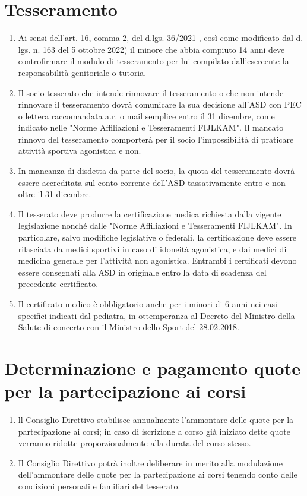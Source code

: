 \documentclass{djtsdoc}
\begin{document}
	\section{Tesseramento}
	\begin{enumerate}
		\item Ai sensi dell'art. 16, comma 2, del d.lgs. 36/2021 , così come modificato dal d. lgs. n. 163 del 5 ottobre 2022) il minore che abbia compiuto 14 anni deve controfirmare il modulo di tesseramento per lui compilato dall'esercente la responsabilità genitoriale o tutoria. 
		\item Il socio tesserato che intende rinnovare il tesseramento o che non intende rinnovare il tesseramento dovrà comunicare la sua decisione all'ASD con PEC o lettera raccomandata a.r. o mail semplice entro il 31 dicembre, come indicato nelle "Norme Affiliazioni e Tesseramenti FIJLKAM". Il mancato rinnovo del tesseramento comporterà per il socio l'impossibilità di praticare attività sportiva agonistica e non. 
		\item In mancanza di disdetta da parte del socio, la quota del tesseramento dovrà essere accreditata sul conto corrente dell'ASD  tassativamente entro e non oltre il 31 dicembre.
		\item Il tesserato deve produrre la certificazione medica richiesta dalla vigente legislazione nonché dalle "Norme Affiliazioni e Tesseramenti FIJLKAM". In particolare, salvo modifiche legislative o federali, la certificazione deve essere rilasciata da medici sportivi in caso di idoneità agonistica, e dai medici di medicina generale per l'attività non agonistica. Entrambi i certificati devono essere consegnati alla ASD in originale entro la data di scadenza del precedente certificato.
		\item Il certificato medico è obbligatorio anche per i minori di 6 anni nei casi specifici indicati dal pediatra, in ottemperanza al Decreto del Ministro della Salute di concerto con il Ministro dello Sport del 28.02.2018.
	\end{enumerate}
	
	\section{Determinazione e pagamento quote per la partecipazione ai corsi}
	\begin{enumerate}
		\item ll Consiglio Direttivo stabilisce annualmente l'ammontare delle quote per la partecipazione ai corsi; in caso di iscrizione a corso già iniziato dette quote verranno ridotte proporzionalmente alla durata del corso stesso. 
		\item Il Consiglio Direttivo potrà inoltre deliberare in merito alla modulazione dell'ammontare  delle quote per la partecipazione ai corsi tenendo conto delle condizioni personali e familiari del tesserato.
	\end{enumerate}
	
\end{document}
